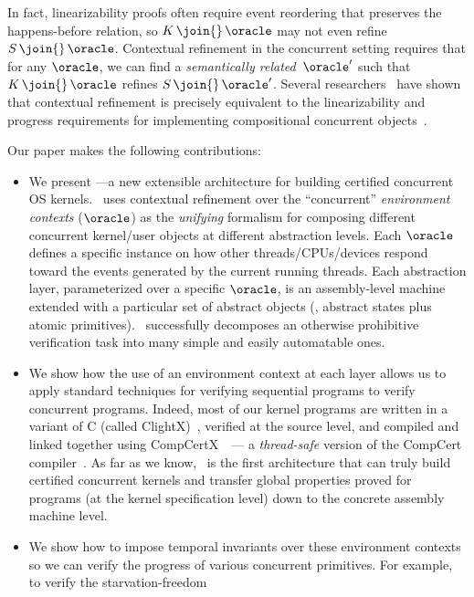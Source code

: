 In fact, linearizability proofs often require event reordering that
preserves the happens-before relation, so $K\,\join{}\,\oracle$ may not
even refine $S\,\join{}\,\oracle$.  Contextual refinement in the
concurrent setting requires that for any $\oracle$, we can find a {\em
  semantically related}\ $\oracle'$ such that $K\,\join{}\,\oracle$ refines
$S\,\join{}\,\oracle'$.  Several
researchers~\cite{filipovic10,liang13,lili16} have shown that
contextual refinement is precisely equivalent to the linearizability
and progress requirements for implementing compositional concurrent
objects~\cite{Herlihy08book,herlihy90}.

Our paper makes the following contributions:
\begin{itemize}[leftmargin=*] %
\item We present {\bf{}\CTOS}---a new extensible architecture for
  building certified concurrent OS kernels.  \CTOS\ uses 
  contextual refinement over the ``concurrent'' {\em environment contexts}
  ($\oracle$) as the {\em unifying} formalism for composing 
  different concurrent kernel/user objects at different
  abstraction levels.  Each $\oracle$ defines a specific instance on how
  other threads/CPUs/devices respond toward the events generated by
  the current running threads.  Each abstraction layer, 
  parameterized over a specific $\oracle$, is an
  assembly-level machine extended with a particular set of
  abstract objects (\ie, abstract states plus atomic primitives).
  \CTOS\ successfully decomposes an
  otherwise prohibitive verification task into many simple and easily
  automatable ones.
\item We show how the use of an environment context at each
  layer allows us to apply standard techniques for
  verifying sequential programs to verify concurrent programs.
  Indeed, most of our kernel programs are written in a variant of C
  (called ClightX)~\cite{dscal15}, verified at the source level, and
  compiled and linked together using
  CompCertX~\cite{dscal15,ccal16}~--- a {\em thread-safe} version of the CompCert
  compiler~\cite{compcert,leroy09}. As far as we
  know, \CTOS\ is the first architecture that can truly build
  certified concurrent kernels and transfer global properties proved
  for programs (at the kernel specification level) down to the
  concrete assembly machine level.
\item We show how to impose temporal invariants over these environment
  contexts so we can verify the progress of various
  concurrent primitives. For example, to verify the starvation-freedom

\end{itemize}

